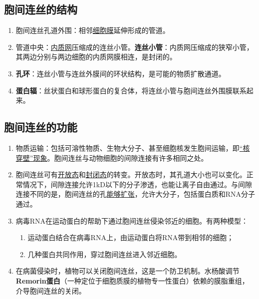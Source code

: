 \subsection{胞间连丝的结构}
\begin{enumerate}
    \item 胞间连丝孔道外围：相邻\uline{细胞膜}延伸形成的管道。
    \item 管道中央：\uline{内质网}压缩成的连丝小管。\textbf{连丝小管}：内质网压缩成的狭窄小管，其两边分别与两边细胞的内质网膜相连，是封闭的。
    \item \textbf{孔环}：连丝小管与连丝外膜间的环状结构，是可能的物质扩散通道。
    \item \textbf{蛋白辐}：丝状蛋白和球形蛋白的复合体，将连丝小管与胞间连丝外围膜联系起来。
\end{enumerate}
\subsection{胞间连丝的功能}
\begin{enumerate}
    \item 物质运输：包括可溶性物质、生物大分子、甚至细胞核发生胞间运输，即\uline{“核穿壁”现象}。胞间连丝与动物细胞的间隙连接有许多相同之处。
    \item 胞间连丝可有\uline{开放态}和\uline{封闭态}的转变。开放态时，其孔道大小也可以变化。正常情况下，间隙连接允许1kD以下的分子渗透，也能让离子自由通过。与间隙连接不同的是，胞间连丝的孔\uline{能够扩张}，允许大分子，包括蛋白质和RNA分子通过。
    \item 病毒RNA在运动蛋白的帮助下通过胞间连丝侵染邻近的细胞。有两种模型：
    \begin{enumerate}
        \item 运动蛋白结合在病毒RNA上，由运动蛋白将RNA带到相邻的细胞；
        \item 几种蛋白共同作用，穿过胞间连丝进入邻近细胞。
    \end{enumerate}
    \item 在病菌侵染时，植物可以关闭胞间连丝，这是一个防卫机制。水杨酸调节\textbf{Remorin蛋白}（一种定位于细胞质膜的植物专一性蛋白）依赖的膜脂重组，介导胞间连丝的关闭。
\end{enumerate}